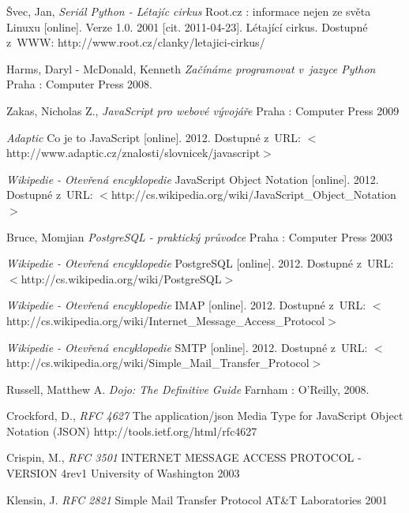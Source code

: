 \documentclass[bc,male,html,dept460]{diploma}				%
\begin{document}
\begin{thebibliography}{99}

Švec, Jan,
\textit {Seriál Python - Létajíc cirkus} Root.cz : informace nejen ze světa Linuxu [online]. Verze 1.0. 2001 [cit. 2011-04-23]. Létající cirkus. Dostupné z~WWW: http://www.root.cz/clanky/letajici-cirkus/


Harms, Daryl - McDonald, Kenneth
\textit {Začínáme programovat v~jazyce Python}
Praha : Computer Press 2008.


Zakas, Nicholas Z.,
\textit{JavaScript pro webové vývojáře}
Praha : Computer Press 2009

\textit{Adaptic}
Co je to JavaScript [online]. 2012. Dostupné z~URL:
$<$http://www.adaptic.cz/znalosti/slovnicek/javascript$>$

\textit{Wikipedie - Otevřená encyklopedie}
JavaScript Object Notation [online]. 2012. Dostupné z~URL:
$<$http://cs.wikipedia.org/wiki/JavaScript\_Object\_Notation$>$

Bruce, Momjian
\textit{PostgreSQL - praktický průvodce}
Praha : Computer Press 2003

\textit{Wikipedie - Otevřená encyklopedie}
PostgreSQL [online]. 2012. Dostupné z~URL:
$<$http://cs.wikipedia.org/wiki/PostgreSQL$>$

\textit{Wikipedie - Otevřená encyklopedie}
IMAP [online]. 2012. Dostupné z~URL:
$<$http://cs.wikipedia.org/wiki/Internet\_Message\_Access\_Protocol$>$

\textit{Wikipedie - Otevřená encyklopedie}
SMTP [online]. 2012. Dostupné z~URL:
$<$http://cs.wikipedia.org/wiki/Simple\_Mail\_Transfer\_Protocol$>$


Russell, Matthew A.
\textit{Dojo: The Definitive Guide} 
Farnham : O'Reilly, 2008.

Crockford, D.,
\textit{RFC 4627} The application/json Media Type for JavaScript Object Notation (JSON)
http://tools.ietf.org/html/rfc4627

Crispin, M.,
\textit{RFC 3501} INTERNET MESSAGE ACCESS PROTOCOL - VERSION 4rev1
University of Washington 2003

Klensin, J.
\textit{RFC 2821} Simple Mail Transfer Protocol
AT\&T Laboratories 2001


\end{thebibliography}
\end{document}
